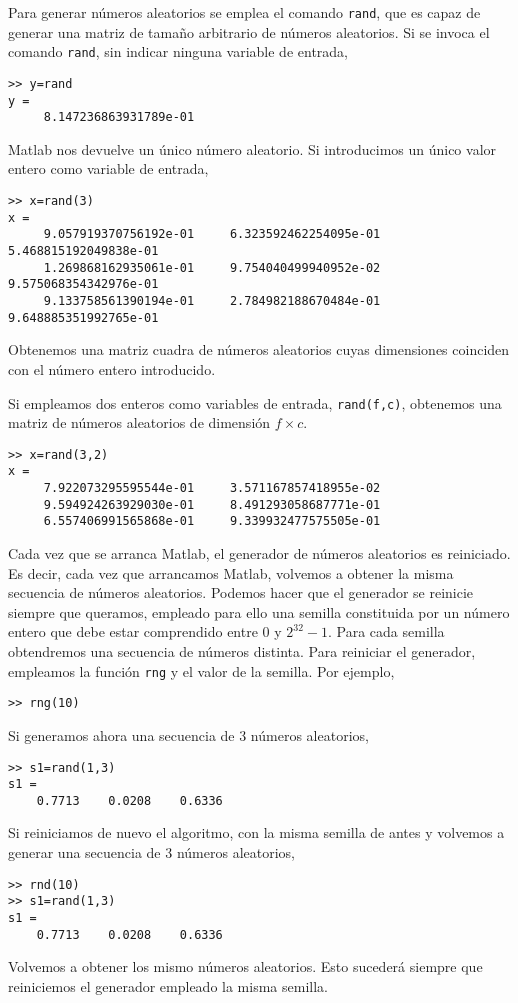 Para generar números aleatorios se emplea el comando \texttt{rand}, que es capaz de generar una matriz de tamaño arbitrario de números aleatorios.  Si se invoca el comando \texttt{rand}, sin indicar ninguna variable de entrada, 
\begin{verbatim}
>> y=rand
y =
     8.147236863931789e-01
\end{verbatim}
Matlab nos devuelve un único número aleatorio. Si introducimos un único valor entero como variable de entrada,
\begin{verbatim}
>> x=rand(3)
x =
     9.057919370756192e-01     6.323592462254095e-01     5.468815192049838e-01
     1.269868162935061e-01     9.754040499940952e-02     9.575068354342976e-01
     9.133758561390194e-01     2.784982188670484e-01     9.648885351992765e-01
\end{verbatim}
Obtenemos una matriz cuadra de números aleatorios cuyas dimensiones coinciden con el número entero introducido. 

Si empleamos dos enteros como variables de entrada, \texttt{rand(f,c)}, obtenemos una matriz de números aleatorios de dimensión $f\times c$.
\begin{verbatim}
>> x=rand(3,2)
x =
     7.922073295595544e-01     3.571167857418955e-02
     9.594924263929030e-01     8.491293058687771e-01
     6.557406991565868e-01     9.339932477575505e-01
\end{verbatim}

Cada vez que se arranca Matlab, el generador de números aleatorios es reiniciado. Es decir, cada vez que arrancamos Matlab, volvemos a obtener la misma secuencia de números aleatorios. Podemos hacer que el generador se reinicie siempre que queramos, empleado para ello una semilla constituida por un número entero que debe estar comprendido entre $0$ y $2^{32}-1$. Para cada semilla obtendremos una secuencia de números distinta. Para reiniciar el generador, empleamos  la función \texttt{rng} y el valor de la semilla. Por ejemplo,
\begin{verbatim}
>> rng(10)
\end{verbatim}

Si generamos ahora una secuencia de 3 números aleatorios,
\begin{verbatim}
>> s1=rand(1,3)
s1 =
    0.7713    0.0208    0.6336
\end{verbatim}
Si reiniciamos de nuevo el algoritmo, con la misma semilla de antes y volvemos a generar una secuencia de 3 números aleatorios,
\begin{verbatim}
>> rnd(10)
>> s1=rand(1,3)
s1 =
    0.7713    0.0208    0.6336
\end{verbatim}
Volvemos a obtener los mismo números aleatorios. Esto sucederá siempre que reiniciemos el generador empleado la misma semilla.


